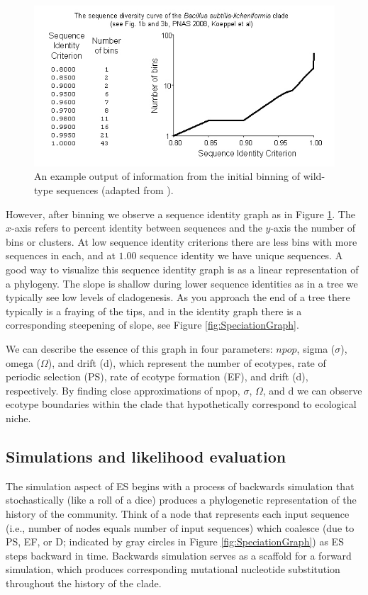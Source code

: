 \begin{figure}[h!]
 \centering
 \label{fig:Binning}
 \includegraphics[scale=1.75]{images/Binning-CH2}
 \caption[Sequence identity graph and example output produced by binning.]{An example output of information from the initial binning of wild-type sequences (adapted from \protect\cite{koeppel2008identifying}). }
\end{figure}

However, after binning we observe a sequence identity graph as in Figure \ref{fig:Binning}.
The $x$-axis refers to percent identity between sequences and the $y$-axis the number of bins or clusters.
At low sequence identity criterions there are less bins with more sequences in each, and at $1.00$ sequence identity we have unique sequences.
A good way to visualize this sequence identity graph is as a linear representation of a phylogeny.
The slope is shallow during lower sequence identities as in a tree we typically see low levels of cladogenesis.
As you approach the end of a tree there typically is a fraying of the tips, and in the identity graph there is a corresponding steepening of slope, see Figure \ref{fig:SpeciationGraph}. %

We can describe the essence of this graph in four parameters: $npop$, sigma ($\sigma$), omega ($\Omega$), and drift (d), which represent the number of ecotypes, rate of periodic selection (PS), rate of ecotype formation (EF), and drift (d), respectively.
By finding close approximations of npop, $\sigma$, $\Omega$, and d we can observe ecotype boundaries within the clade that hypothetically correspond to ecological niche.

\subsection*{Simulations and likelihood evaluation}
The simulation aspect of ES begins with a process of backwards simulation that stochastically (like a roll of a dice) produces a phylogenetic representation of the history of the community.
Think of a node that represents each input sequence (i.e., number of nodes equals number of input sequences) which coalesce (due to PS, EF, or D; indicated by gray circles in Figure \ref{fig:SpeciationGraph}) as ES steps backward in time.
Backwards simulation serves as a scaffold for a forward simulation, which produces corresponding mutational nucleotide substitution throughout the history of the clade.

